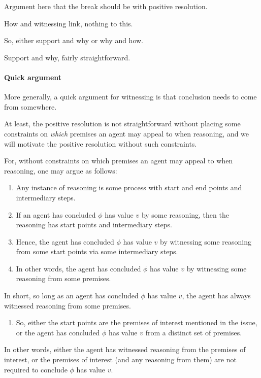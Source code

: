 \begin{note}
  Argument here that the break should be with positive resolution.

  How and witnessing link, nothing to this.

  So, either support and why or why and how.

  Support and why, fairly straightforward.
\end{note}


\paragraph*{Quick argument}

\begin{note}
  More generally, a quick argument for witnessing is that conclusion needs to come from somewhere.
\end{note}

\begin{note}
  At least, the positive resolution is not straightforward without placing some constraints on \emph{which} premises an agent may appeal to when reasoning, and we will motivate the positive resolution without such constraints.

  For, without constraints on which premises an agent may appeal to when reasoning, one may argue as follows:
  \begin{enumerate}
  \item
    Any instance of reasoning is some process with start and end points and intermediary steps.
  \item
    If an agent has concluded \(\phi\) has value \(v\) by some reasoning, then the reasoning has start points and intermediary steps.
  \item
    Hence, the agent has concluded \(\phi\) has value \(v\) by witnessing some reasoning from some start points via some intermediary steps.
  \item
    In other words, the agent has concluded \(\phi\) has value \(v\) by witnessing some reasoning from some premises.
  \end{enumerate}

  In short, so long as an agent has concluded \(\phi\) has value \(v\), the agent has always witnessed reasoning from some premises.

  \begin{enumerate}[resume]
  \item
    So, either the start points are the premises of interest mentioned in the issue, or the agent has concluded \(\phi\) has value \(v\) from a distinct set of premises.
  \end{enumerate}

  In other words, either the agent has witnessed reasoning from the premises of interest, or the premises of interest (and any reasoning from them) are not required to conclude \(\phi\) has value \(v\).
\end{note}

